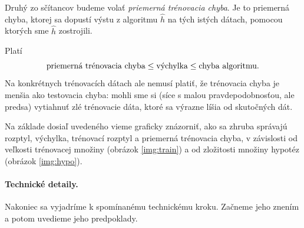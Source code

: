 \medskip

Druhý zo sčítancov budeme volať \emph{priemerná trénovacia chyba}.
Je to priemerná chyba, ktorej sa dopustí výstu z algoritmu $\hat{h}$
na tých istých dátach, pomocou ktorých sme $\hat{h}$ zostrojili.

\medskip

Platí
$$ {\normalfont \text{priemerná trénovacia chyba}} \leq \vychylka \leq \chalg. $$
Na konkrétnych trénovacích dátach ale nemusí platiť, že trénovacia
chyba je menšia ako testovacia chyba: mohli sme si (síce s malou
pravdepodobnosťou, ale predsa) vytiahnuť zlé trénovacie dáta, ktoré
sa výrazne líšia od skutočných dát.

\medskip

Na základe dosiaľ uvedeného vieme graficky znázorniť, ako sa zhruba správajú
rozptyl, výchylka, trénovací rozptyl a priemerná trénovacia chyba,
v závislosti od veľkosti trénovacej množiny (obrázok \ref{img:train})
a od zložitosti množiny hypotéz (obrázok \ref{img:hypo}).




\paragraph{Technické detaily.}
Nakoniec sa vyjadríme k spomínanému technickému kroku. Začneme jeho
znením a potom uvedieme jeho predpoklady.

